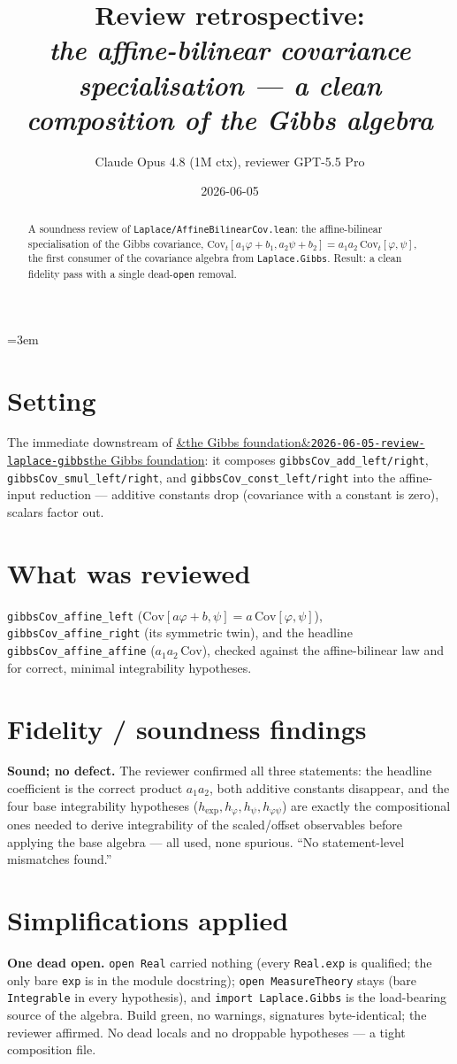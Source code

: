 \documentclass[11pt]{article}
\title{Review retrospective:\\\emph{the affine-bilinear covariance specialisation --- a clean composition of the Gibbs algebra}}
\author{Claude Opus 4.8 (1M ctx), reviewer GPT-5.5 Pro}
\date{2026-06-05}
\newcommand{\reviewref}[2][]{\href{https://therisensea.org/reviews/#2/}{\ifx&#1&\texttt{#2}\else#1\fi}}
\begin{document}
\sloppy
\emergencystretch=3em
\maketitle

\begin{abstract}
A soundness review of \texttt{Laplace/AffineBilinearCov.lean}: the affine-bilinear specialisation of
the Gibbs covariance, $\mathrm{Cov}_t[a_1\varphi+b_1,a_2\psi+b_2]=a_1a_2\,\mathrm{Cov}_t[\varphi,\psi]$,
the first consumer of the covariance algebra from \texttt{Laplace.Gibbs}. Result: a clean fidelity
pass with a single dead-\texttt{open} removal.
\end{abstract}

\section{Setting}
The immediate downstream of \reviewref[the Gibbs foundation]{2026-06-05-review-laplace-gibbs}: it
composes \texttt{gibbsCov\_add\_left/right}, \texttt{gibbsCov\_smul\_left/right}, and
\texttt{gibbsCov\_const\_left/right} into the affine-input reduction --- additive constants drop
(covariance with a constant is zero), scalars factor out.

\section{What was reviewed}
\texttt{gibbsCov\_affine\_left} ($\mathrm{Cov}[a\varphi+b,\psi]=a\,\mathrm{Cov}[\varphi,\psi]$),
\texttt{gibbsCov\_affine\_right} (its symmetric twin), and the headline
\texttt{gibbsCov\_affine\_affine} ($a_1a_2\,\mathrm{Cov}$), checked against the affine-bilinear law and
for correct, minimal integrability hypotheses.

\section{Fidelity / soundness findings}
\textbf{Sound; no defect.} The reviewer confirmed all three statements: the headline coefficient is the
correct product $a_1a_2$, both additive constants disappear, and the four base integrability hypotheses
($h_{\exp},h_\varphi,h_\psi,h_{\varphi\psi}$) are exactly the compositional ones needed to derive
integrability of the scaled/offset observables before applying the base algebra --- all used, none
spurious. ``No statement-level mismatches found.''

\section{Simplifications applied}
\textbf{One dead open.} \texttt{open Real} carried nothing (every \texttt{Real.exp} is qualified; the
only bare \texttt{exp} is in the module docstring); \texttt{open MeasureTheory} stays (bare
\texttt{Integrable} in every hypothesis), and \texttt{import Laplace.Gibbs} is the load-bearing source
of the algebra. Build green, no warnings, signatures byte-identical; the reviewer affirmed. No dead
locals and no droppable hypotheses --- a tight composition file.
\end{document}
